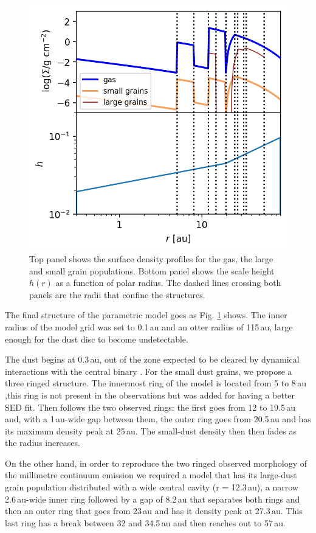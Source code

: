 \documentclass[letters, usenatbib]{mnras}
\begin{document}
\begin{figure}
	\includegraphics[width=\columnwidth]{allprofiles.png}
    \caption{Top panel shows the surface density profiles for the gas, the large and small grain populations. Bottom panel shows the scale height $h(r)$ as a function of polar radius. The dashed lines crossing both panels are the radii that confine the structures.}
    \label{fig:profiles}
\end{figure}

The final structure of the parametric model goes as Fig. \ref{fig:profiles} shows. The inner radius of the model grid was set to 0.1\,au and an otter radius of 115\,au, large enough for the dust disc to become undetectable.

The dust begins at 0.3\,au, out of the zone expected to be cleared by dynamical interactions with the central binary \citep{Art_Lu}. For the small dust grains, we propose a three ringed structure. The innermost ring of the model is located from 5 to 8\,au ,this ring is not present in the observations but was added for having a better SED fit. Then follows the two observed rings: the first goes from 12 to 19.5\,au and, with a 1\,au-wide gap between them, the outer ring goes from 20.5\,au and has its maximum density peak at 25\,au. The small-dust density then then fades as the radius increases.

On the other hand, in order to reproduce the two ringed observed morphology of the millimetre continuum emission we required a model that has its large-dust grain population distributed with a wide central cavity (r = 12.3\,au), a narrow 2.6\,au-wide inner ring followed by a gap of 8.2\,au that separates both rings and then an outer ring that goes from 23\,au and has it density peak at 27.3\,au. This last ring has a break between 32 and 34.5\,au and then reaches out to 57\,au.
\end{document}
